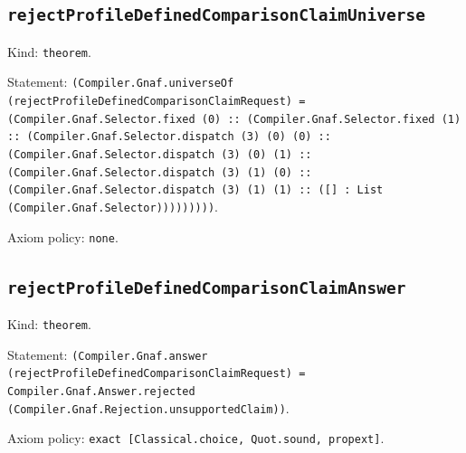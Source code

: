 \documentclass[11pt]{article}
\begin{document}
\subsection*{\texttt{rejectProfileDefinedComparisonClaimUniverse}}
\noindent Kind: \texttt{theorem}.\par
\noindent Statement: \texttt{(Compiler.Gnaf.universeOf (rejectProfileDefinedComparisonClaimRequest) = (Compiler.Gnaf.Selector.fixed (0) :: (Compiler.Gnaf.Selector.fixed (1) :: (Compiler.Gnaf.Selector.dispatch (3) (0) (0) :: (Compiler.Gnaf.Selector.dispatch (3) (0) (1) :: (Compiler.Gnaf.Selector.dispatch (3) (1) (0) :: (Compiler.Gnaf.Selector.dispatch (3) (1) (1) :: ([] : List (Compiler.Gnaf.Selector)))))))))}.\par
\noindent Axiom policy: \texttt{none}.\par
\subsection*{\texttt{rejectProfileDefinedComparisonClaimAnswer}}
\noindent Kind: \texttt{theorem}.\par
\noindent Statement: \texttt{(Compiler.Gnaf.answer (rejectProfileDefinedComparisonClaimRequest) = Compiler.Gnaf.Answer.rejected (Compiler.Gnaf.Rejection.unsupportedClaim))}.\par
\noindent Axiom policy: \texttt{exact [Classical.choice, Quot.sound, propext]}.\par
\end{document}
